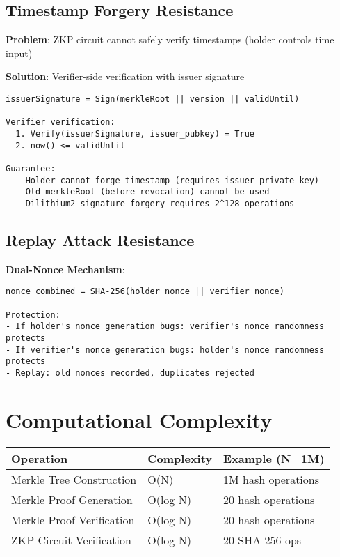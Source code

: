 \subsection{Timestamp Forgery Resistance}

\textbf{Problem}: ZKP circuit cannot safely verify timestamps (holder controls time input)

\textbf{Solution}: Verifier-side verification with issuer signature

\begin{verbatim}
issuerSignature = Sign(merkleRoot || version || validUntil)

Verifier verification:
  1. Verify(issuerSignature, issuer_pubkey) = True
  2. now() <= validUntil

Guarantee:
  - Holder cannot forge timestamp (requires issuer private key)
  - Old merkleRoot (before revocation) cannot be used
  - Dilithium2 signature forgery requires 2^128 operations
\end{verbatim}

\subsection{Replay Attack Resistance}

\textbf{Dual-Nonce Mechanism}:

\begin{verbatim}
nonce_combined = SHA-256(holder_nonce || verifier_nonce)

Protection:
- If holder's nonce generation bugs: verifier's nonce randomness protects
- If verifier's nonce generation bugs: holder's nonce randomness protects
- Replay: old nonces recorded, duplicates rejected
\end{verbatim}

\section{Computational Complexity}

\begin{table}[h]
\centering
\begin{tabular}{|l|l|l|}
\hline
\textbf{Operation} & \textbf{Complexity} & \textbf{Example (N=1M)} \\
\hline
Merkle Tree Construction & O(N) & 1M hash operations \\
\hline
Merkle Proof Generation & O(log N) & 20 hash operations \\
\hline
Merkle Proof Verification & O(log N) & 20 hash operations \\
\hline
ZKP Circuit Verification & O(log N) & 20 SHA-256 ops \\
\hline
\end{tabular}
\end{table}


